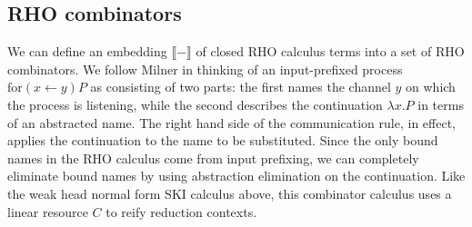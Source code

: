 \documentclass[a4paper,UKenglish]{lipics-v2016}
\newcommand{\for}{\mathrm{for }}
\newcommand{\interp}[1]{\llbracket #1 \rrbracket}
\newcommand{\from}{\leftarrow}
\begin{document}
\subsection{RHO combinators}
We can define an embedding $\interp{-}$ of closed RHO calculus terms into a set of RHO combinators.  We follow Milner \cite{milner91polyadicpi} in thinking of an input-prefixed process $\for(x \from y)P$ as consisting of two parts: the first names the channel $y$ on which the process is listening, while the second describes the continuation $\lambda x.P$ in terms of an abstracted name.  The right hand side of the communication rule, in effect, applies the continuation to the name to be substituted.  Since the only bound names in the RHO calculus come from input prefixing, we can completely eliminate bound names by using abstraction elimination on the continuation.  Like the weak head normal form SKI calculus above, this combinator calculus uses a linear resource $C$ to reify reduction contexts.
\end{document}
